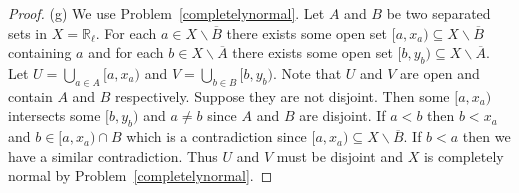 \documentclass{article}
\begin{document}
\begin{proof}
(g) We use Problem~\ref{completelynormal}. Let $A$ and $B$ be two separated sets in $X = \mathbb{R}_{\ell}$. For each $a \in X \backslash \overline{B}$ there exists some open set $[a,x_a) \subseteq X \backslash \overline{B}$ containing $a$ and for each $b \in X \backslash \overline{A}$ there exists some open set $[b,y_b) \subseteq X \backslash \overline{A}$. Let $U = \bigcup_{a \in A} [a, x_a)$ and $V = \bigcup_{b \in B} [b, y_b)$. Note that $U$ and $V$ are open and contain $A$ and $B$ respectively. Suppose they are not disjoint. Then some $[a,x_a)$ intersects some $[b,y_b)$ and $a \neq b$ since $A$ and $B$ are disjoint. If $a < b$ then $b < x_a$ and $b \in [a, x_a) \cap B$ which is a contradiction since $[a,x_a) \subseteq X \backslash \overline{B}$. If $b < a$ then we have a similar contradiction. Thus $U$ and $V$ must be disjoint and $X$ is completely normal by Problem~\ref{completelynormal}.
\end{proof}
\end{document}
